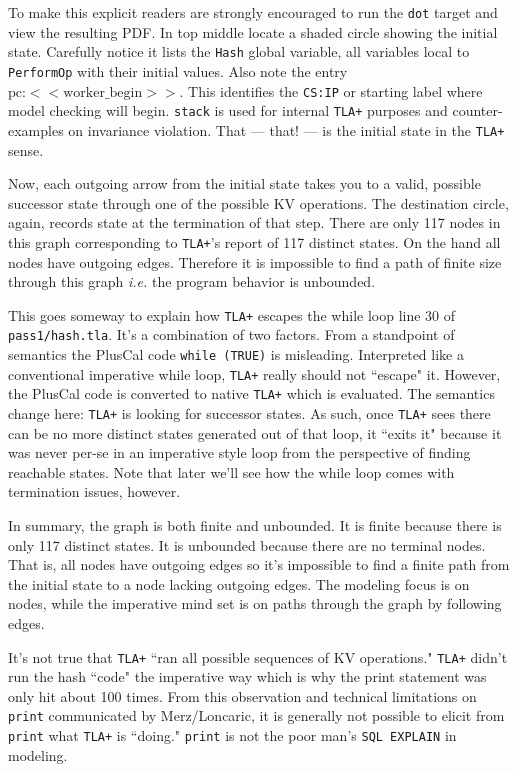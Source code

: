 \documentclass[twocolumn]{article}
\begin{document}
To make this explicit readers are strongly encouraged to run the \texttt{dot} target and view the resulting PDF. In top middle locate a shaded circle showing the initial state. Carefully notice it lists the \texttt{Hash} global variable, all variables local to \texttt{PerformOp} with their initial values. Also note the entry $\text{pc:}<<\text{worker\_begin}>>$. This identifies the \texttt{CS:IP} or starting label where model checking will begin. \texttt{stack} is used for internal \texttt{TLA+} purposes and counter-examples on invariance violation.
That --- that! --- is the initial state in the \texttt{TLA+} sense. 

Now, each outgoing arrow from the initial state takes you to a valid, possible successor state through one of the possible KV operations. The destination circle, again, records state at the termination of that step. There are only 117 nodes in this graph corresponding to \texttt{TLA+}'s report of 117 distinct states. On the hand all nodes have outgoing edges. Therefore it is impossible to find a path of finite size through this graph \emph{i.e.} the program behavior is unbounded. 

This goes someway to explain how \texttt{TLA+} escapes the while loop line 30 of \texttt{pass1/hash.tla}. It's a combination of two factors. From a standpoint of semantics the PlusCal code \texttt{while (TRUE)} is misleading. Interpreted like a conventional imperative while loop, \texttt{TLA+} really should not ``escape" it. However, the PlusCal code is converted to native \texttt{TLA+} which is evaluated. The semantics change here: \texttt{TLA+} is looking for successor states. As such, once \texttt{TLA+} sees there can be no more distinct states generated out of that loop, it ``exits it" because it was never per-se in an imperative style loop from the perspective of finding reachable states. Note that later we'll see how the while loop comes with termination issues, however.

In summary, the graph is both finite and unbounded. It is finite because there is only 117 distinct states. It is unbounded because there are no terminal nodes. That is, all nodes have outgoing edges so it's impossible to find a finite path from the initial state to a node lacking outgoing edges. The modeling focus is on nodes, while the imperative mind set is on paths through the graph by following edges. 

It's not true that \texttt{TLA+} ``ran all possible sequences of KV operations." \texttt{TLA+} didn't run the hash ``code" the imperative way which is why the print statement was only hit about 100 times. From this observation and technical limitations on \texttt{print} communicated by Merz/Loncaric, it is generally not possible to elicit from \texttt{print} what \texttt{TLA+} is ``doing." \texttt{print} is not the poor man's \texttt{SQL EXPLAIN} in modeling.
\end{document}

